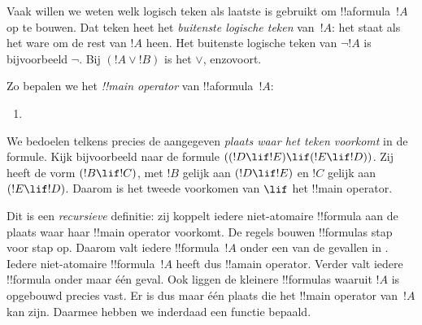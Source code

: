 \documentclass[../../../include/open-logic-section]{subfiles}
\begin{document}


\begin{explain}
Vaak willen we weten welk logisch teken als laatste is gebruikt om
!!a{formula}~$!A$ op te bouwen. Dat teken heet het \emph{buitenste
  logische teken} van~$!A$: het staat als het ware om de rest van
$!A$ heen. Het buitenste logische teken van $\lnot !A$ is bijvoorbeeld
$\lnot$. Bij $(!A \lor !B)$ is het $\lor$, enzovoort.
\end{explain}


\begin{defn}
Zo bepalen we het \emph{!!{main operator}} van !!a{formula}~$!A$:
\begin{enumerate}
\item {}







\end{enumerate}
\end{defn}

We bedoelen telkens precies de aangegeven \emph{plaats waar het teken
voorkomt} in de formule. Kijk bijvoorbeeld naar de formule
$((!D \lif !E) \lif (!E \lif !D))$. Zij heeft de vorm $(!B \lif !C)$,
met $!B$ gelijk aan $(!D \lif !E)$ en $!C$ gelijk aan $(!E \lif !D)$.
Daarom is het tweede voorkomen van $\lif$ het !!{main operator}.

\begin{explain}
Dit is een \emph{recursieve} definitie: zij koppelt iedere niet-atomaire
!!{formula} aan de plaats waar haar !!{main operator} voorkomt. De
regels bouwen !!{formula}s stap voor stap op. Daarom valt iedere
!!{formula}~$!A$ onder een van de gevallen in .
Iedere niet-atomaire !!{formula}~$!A$ heeft dus !!a{main operator}.
Verder valt iedere !!{formula} onder maar één geval. Ook liggen de
kleinere !!{formula}s waaruit $!A$ is opgebouwd precies vast. Er is dus
maar één plaats die het !!{main operator} van~$!A$ kan zijn. Daarmee
hebben we inderdaad een functie bepaald.
\end{explain}
\end{document}

